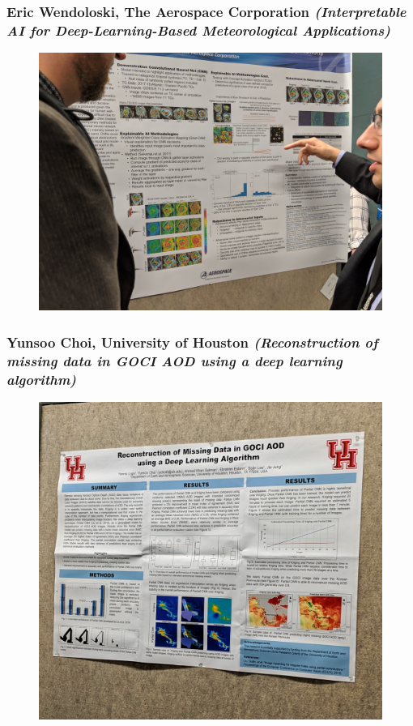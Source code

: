\documentclass{beamer}
\begin{document}
\begin{frame}
\frametitle{Eric Wendoloski, The Aerospace Corporation \textit{(Interpretable AI for Deep-Learning-Based Meteorological Applications)}}
\begin{figure}
	\includegraphics[width=.9\linewidth]{figs/IMG_20190423_140820.jpg}
\end{figure}
\end{frame}

\begin{frame}
\frametitle{Yunsoo Choi, University of Houston \textit{(Reconstruction of missing data in GOCI AOD using a deep learning algorithm)}}
\begin{figure}
	\includegraphics[width=.9\linewidth]{figs/IMG_20190423_143507.jpg}
\end{figure}
\end{frame}
\end{document}
